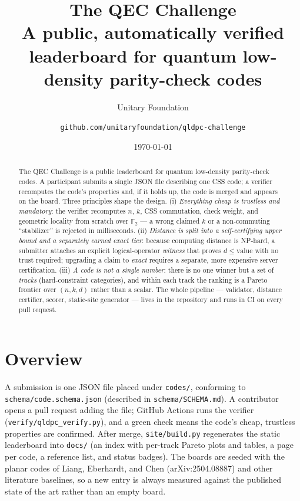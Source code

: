 \documentclass[11pt]{article}
\title{\textbf{The QEC Challenge}\\[4pt]
	\large A public, automatically verified leaderboard for quantum
	low-density parity-check codes}
\author{Unitary Foundation \and
	\texttt{github.com/unitaryfoundation/qldpc-challenge}}
\date{\vspace{-2ex}\today}
\newcommand{\GF}{\mathbb{F}_2}
\begin{document}
	\maketitle

	\begin{abstract}
		The QEC Challenge is a public leaderboard for quantum low-density
		parity-check codes. A participant submits a single JSON file describing
		one CSS code; a verifier recomputes the code's properties and, if it
		holds up, the code is merged and appears on the board. Three principles
		shape the design. (i) \emph{Everything cheap is trustless and
		mandatory}: the verifier recomputes $n$, $k$, CSS commutation, check
		weight, and geometric locality from scratch over $\GF$ --- a wrong
		claimed $k$ or a non-commuting ``stabilizer'' is rejected in
		milliseconds. (ii) \emph{Distance is split into a self-certifying upper
		bound and a separately earned exact tier}: because computing distance
		is NP-hard, a submitter attaches an explicit logical-operator
		\emph{witness} that proves $d\le\text{value}$ with no trust required;
		upgrading a claim to \emph{exact} requires a separate, more expensive
		server certification. (iii) \emph{A code is not a single number}: there
		is no one winner but a set of \emph{tracks} (hard-constraint
		categories), and within each track the ranking is a Pareto frontier
		over $(n,k,d)$ rather than a scalar. The whole pipeline ---
		validator, distance certifier, scorer, static-site generator --- lives
		in the repository and runs in CI on every pull request.
	\end{abstract}

	\section{Overview}

	A submission is one JSON file placed under \texttt{codes/}, conforming to
	\texttt{schema/code.schema.json} (described in \texttt{schema/SCHEMA.md}). A
	contributor opens a pull request adding the file; GitHub Actions runs the
	verifier (\texttt{verify/qldpc\_verify.py}), and a green check means the
	code's cheap, trustless properties are confirmed. After merge,
	\texttt{site/build.py} regenerates the static leaderboard into
	\texttt{docs/} (an index with per-track Pareto plots and tables, a page per
	code, a reference list, and status badges). The boards are seeded with the
	planar codes of Liang, Eberhardt, and Chen (arXiv:2504.08887) and other
	literature baselines, so a new entry is always measured against the
	published state of the art rather than an empty board.
\end{document}
